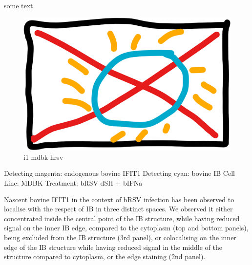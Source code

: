  \label{bIFIT1 Localisation During h/bRSV Infection}
some text

\begin{figure}
    \centering
    \includegraphics[width=0.5\linewidth]{06. Chapter 1//Figs/00. placeholder.png}
    \caption[i1 mdbk hrsv]{i1 mdbk hrsv}
    \label{i1 beas2b brsv}
\end{figure}

Detecting magenta: endogenous bovine IFIT1 \newline
Detecting cyan: bovine IB \newline
Cell Line: MDBK \newline
Treatment: bRSV dSH + bIFNa \newline

Nascent bovine IFIT1 in the context of bRSV infection has been observed to localise with the respect of IB in three distinct spaces. We observed it either concentrated inside the central point of the IB structure, while having reduced signal on the inner IB edge, compared to the cytoplasm (top and bottom panels), being excluded from the IB structure (3rd panel), or colocalising on the inner edge of the IB structure while having reduced signal in the middle of the structure compared to cytoplasm, or the edge staining (2nd panel).


